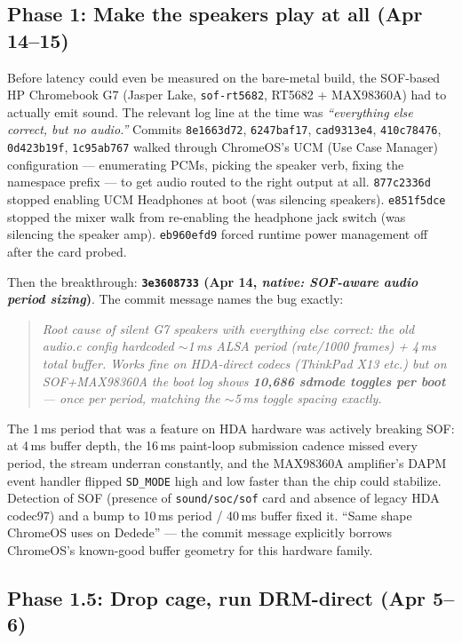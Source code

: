 \documentclass[10pt,letterpaper,twocolumn]{article}
\begin{document}
\subsection{Phase 1: Make the speakers play at all (Apr 14--15)}

Before latency could even be measured on the bare-metal build, the SOF-based HP Chromebook G7 (Jasper Lake, \texttt{sof-rt5682}, RT5682 + MAX98360A) had to actually emit sound. The relevant log line at the time was \emph{``everything else correct, but no audio.''} Commits \texttt{8e1663d72}, \texttt{6247baf17}, \texttt{cad9313e4}, \texttt{410c78476}, \texttt{0d423b19f}, \texttt{1c95ab767} walked through ChromeOS's UCM (Use Case Manager) configuration --- enumerating PCMs, picking the speaker verb, fixing the namespace prefix --- to get audio routed to the right output at all. \texttt{877c2336d} stopped enabling UCM Headphones at boot (was silencing speakers). \texttt{e851f5dce} stopped the mixer walk from re-enabling the headphone jack switch (was silencing the speaker amp). \texttt{eb960efd9} forced runtime power management off after the card probed.

Then the breakthrough: \textbf{\texttt{3e3608733} (Apr 14, \emph{native: SOF-aware audio period sizing})}. The commit message names the bug exactly:

\begin{quote}\small\itshape
Root cause of silent G7 speakers with everything else correct: the old audio.c config hardcoded $\sim$1\,ms ALSA period (rate/1000 frames) + 4\,ms total buffer. Works fine on HDA-direct codecs (ThinkPad X13 etc.) but on SOF+MAX98360A the boot log shows \textbf{10{,}686 sdmode toggles per boot} --- once per period, matching the $\sim$5\,ms toggle spacing exactly.
\end{quote}

The 1\,ms period that was a feature on HDA hardware was actively breaking SOF: at 4\,ms buffer depth, the 16\,ms paint-loop submission cadence missed every period, the stream underran constantly, and the MAX98360A amplifier's DAPM event handler flipped \texttt{SD\_MODE} high and low faster than the chip could stabilize. Detection of SOF (presence of \texttt{sound/soc/sof} card and absence of legacy HDA codec97) and a bump to 10\,ms period / 40\,ms buffer fixed it. ``Same shape ChromeOS uses on Dedede'' --- the commit message explicitly borrows ChromeOS's known-good buffer geometry for this hardware family.

\subsection{Phase 1.5: Drop cage, run DRM-direct (Apr 5--6)}
\end{document}
